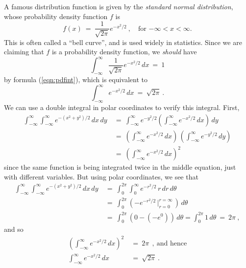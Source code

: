\begin{exmp}\label{exmp:normaldistrib}
 A famous distribution function is given by the \emph{standard normal distribution}, whose probability density function
 $f$ is
 \begin{equation}\label{eqn:normalpdf}
  f(x) ~=~ \frac{1}{\sqrt{2\pi}} e^{-x^2 /2}~, \quad \text{for $-\infty < x < \infty$.}
 \end{equation}
 This is often called a ``bell curve'', and is used widely in statistics. 
 Since we are claiming that $f$ is a probability density function,
 we \emph{should} have
 \begin{equation}
  \int_{-\infty}^{\infty} \frac{1}{\sqrt{2\pi}} e^{-x^2 /2}\,dx ~=~ 1
 \end{equation}
 by formula (\ref{eqn:pdfint}), which is equivalent to
 \begin{equation}
  \int_{-\infty}^{\infty} e^{-x^2 /2}\,dx ~=~ \sqrt{2\pi} ~.
 \end{equation}
 We can use a double integral in polar coordinates to verify this integral. First,
 \begin{align*}
  \int_{-\infty}^{\infty} \int_{-\infty}^{\infty} e^{-(x^2 + y^2 )/2}\,dx\,dy ~&=~
  \int_{-\infty}^{\infty} e^{-y^2 /2} \left( \int_{-\infty}^{\infty} e^{-x^2 /2}\,dx \right) \,dy\\[6pt]
  &=~ \left( \int_{-\infty}^{\infty} e^{-x^2 /2}\,dx \right)\,\left( \int_{-\infty}^{\infty} e^{-y^2 /2}\,dy \right)\\[6pt]
  &=~ \left( \int_{-\infty}^{\infty} e^{-x^2 /2}\,dx \right)^2
 \end{align*}
 since the same function is being integrated twice in the middle equation, just with different variables. But using
 polar coordinates, we see that
 \begin{align*}
  \int_{-\infty}^{\infty} \int_{-\infty}^{\infty} e^{-(x^2 + y^2 )/2}\,dx\,dy
  ~&=~ \int_0^{2\pi} \int_0^{\infty} e^{-r^2 /2}\,r\,dr\,d\theta\\[6pt]
  &=~ \int_0^{2\pi} \left( -e^{-r^2 /2} \,\Bigg|_{r=0}^{r=\infty} \,\right)\,d\theta\\[6pt]
  &=~ \int_0^{2\pi} (0 - (-e^0))\,d\theta = \int_0^{2\pi} 1\,d\theta ~=~ 2\pi ~,
 \end{align*}
 and so
 \begin{align*}
  \left( \int_{-\infty}^{\infty} e^{-x^2 /2}\,dx \right)^2 ~&=~ 2\pi ~~,~\text{and hence}\\[6pt]
  \int_{-\infty}^{\infty} e^{-x^2 /2}\,dx ~&=~ \sqrt{2\pi} ~.
 \end{align*}
\end{exmp}
